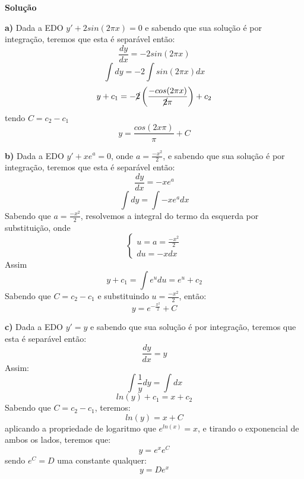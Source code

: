 \linespread{1.5}

\textbf{Solução}

\textbf{a)} Dada a EDO $y'+2sin(2\pi x)=0$ e sabendo que sua solução é por integração, teremos que esta é separável então:
\begin{equation*}
    \frac{dy}{dx} = -2sin(2\pi x)
\end{equation*}
\begin{equation*}
    \int dy = -2\int sin(2\pi x) dx 
\end{equation*}
\begin{equation*}
    y + c_1 = -\cancel{2}\left(\frac{-cos(2\pi x)}{\cancel{2}\pi}\right) + c_2
\end{equation*}
tendo $C = c_2-c_1$
\begin{equation*}
    \boxed{y = \frac{cos(2x\pi)}{\pi} + C}
\end{equation*}

\textbf{b)}
Dada a EDO $y'+xe^a = 0$, onde $a=\frac{-x^2}{2}$, e sabendo que sua solução é por integração, teremos que esta é separável então:
\begin{equation*}
    \frac{dy}{dx} = -xe^a 
\end{equation*}
\begin{equation*}
    \int dy = \int -xe^a dx
\end{equation*}
Sabendo que $a = \frac{-x^2}{2}$, resolvemos a integral do termo da esquerda por substituição, onde
\begin{equation*}
    \begin{cases}
    u = a = \frac{-x^2}{2}\\
    du = -x dx
    \end{cases}
\end{equation*}
Assim
\begin{equation*}
    y + c_1 = \int e^u du = e^u + c_2
\end{equation*}
Sabendo que $C = c_2-c_1$ e substituindo $u = \frac{-x^2}{2}$, então:
\begin{equation*}
    \boxed{y = e^{-\frac{x^2}{2}} + C}
\end{equation*}

\textbf{c)} Dada a EDO $y' = y$ e sabendo que sua solução é por integração, teremos que esta é separável então:
\begin{equation*}
    \frac{dy}{dx} = y
\end{equation*}
Assim:
\begin{equation*}
    \int \frac{1}{y}dy = \int dx
\end{equation*}
\begin{equation*}
    ln(y) + c_1 = x + c_2
\end{equation*}
Sabendo que $C = c_2-c_1$, teremos:
\begin{equation*}
    ln(y) = x + C
\end{equation*}
aplicando a propriedade de logaritmo que $e^{ln(x)} = x$, e tirando o exponencial de ambos os lados, teremos que:
\begin{equation*}
    y = e^{x}e^C
\end{equation*}
sendo $e^C=D$ uma constante qualquer:
\begin{equation*}
    \boxed{y = De^x}
\end{equation*}

